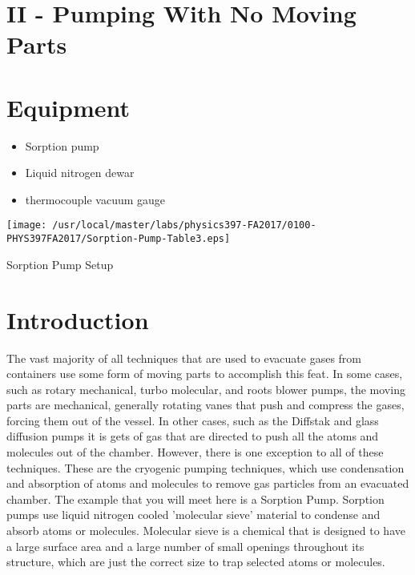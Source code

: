 \section{II - Pumping With No Moving Parts}

\section{Equipment}

\begin{minipage}[t]{0.5\textwidth}
\begin{itemize}[noitemsep]
\item Sorption pump
\item Liquid nitrogen dewar
\end{itemize}
\end{minipage}
\begin{minipage}[t]{0.5\textwidth}
\begin{itemize}[noitemsep]
\item thermocouple vacuum gauge
\end{itemize}
\end{minipage}

\begin{marginfigure}
\texttt{[image: /usr/local/master/labs/physics397-FA2017/0100-PHYS397FA2017/Sorption-Pump-Table3.eps]}
\caption{Sorption Pump Setup}
\label{fig:VACsetup2}
\end{marginfigure}

\section{Introduction}

The vast majority of all techniques that are used to evacuate gases from containers use some form of moving parts to accomplish this feat. In some cases, such as rotary mechanical, turbo molecular, and roots blower pumps, the moving parts are mechanical, generally rotating vanes that push and compress the gases, forcing them out of the vessel. In other cases, such as the Diffstak and glass diffusion pumps it is gets of gas that are directed to push all the atoms and molecules out of the chamber. However, there is one exception to all of these techniques.  These are the cryogenic pumping techniques, which use condensation and absorption of atoms and molecules to remove gas particles from an evacuated chamber. The example that you will meet here is a Sorption Pump. Sorption pumps use liquid nitrogen cooled 'molecular sieve' material to condense and absorb atoms or molecules. Molecular sieve is a chemical that is designed to have a large surface area and a large number of small openings throughout its structure, which are just the correct size to trap selected atoms or molecules.

